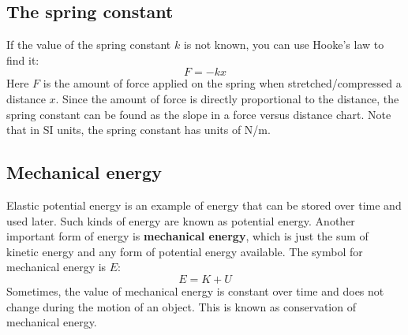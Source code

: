 \subsection{The spring constant}
%
If the value of the spring constant $k$ is not known, you can use Hooke's law to find it:
\begin{equation}
    F = -kx
\end{equation}
Here $F$ is the amount of force applied on the spring when stretched/compressed a distance $x$. Since the amount of force is directly proportional to the distance, the spring constant can be found as the slope in a force versus distance chart. Note that in SI units, the spring constant has units of N/m.
%
\subsection{Mechanical energy}
%
Elastic potential energy is an example of energy that can be stored over time and used later. Such kinds of energy are known as potential energy. Another important form of energy is \textbf{mechanical energy}, which is just the sum of kinetic energy and any form of potential energy available. The symbol for mechanical energy is $E$:
\begin{equation}
    E = K + U
\end{equation}
Sometimes, the value of mechanical energy is constant over time and does not change during the motion of an object. This is known as conservation of mechanical energy.
%
